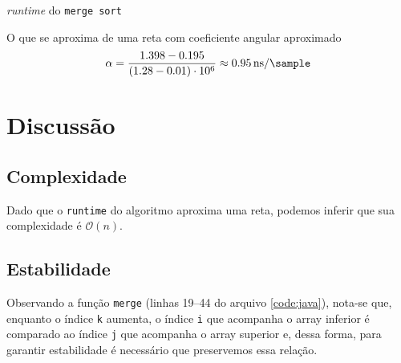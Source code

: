 \documentclass[12pt,reqno]{amsart}
\begin{document}
\begin{table}[h!]
  \centering
  \caption{\textit{runtime} do \texttt{merge sort}}
\end{table}

\begin{center}
\end{center}

O que se aproxima de uma reta com coeficiente angular aproximado
\[\alpha=\dfrac{1.398-0.195}{(1.28-0.01)\cdot10^6}\approx\SI[per-mode=symbol]{0.95}{\nano\second\per\sample} \]

\section{Discussão}
\subsection{Complexidade}
Dado que o \texttt{runtime} do algoritmo aproxima uma reta, podemos inferir que
sua complexidade é $\mathcal{O}(n)$.

\subsection{Estabilidade}
Observando a função \texttt{merge} (linhas 19--44 do arquivo \ref{code:java}),
nota-se que, enquanto o índice \texttt{k} aumenta, o índice \texttt{i}
que acompanha o array inferior é comparado ao índice \texttt{j}
que acompanha o array superior e, dessa forma, para garantir
estabilidade é necessário que preservemos essa relação.
\end{document}
